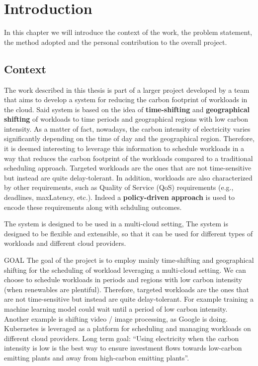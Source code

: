 \chapter{Introduction}
\label{cha:introduction}

In this chapter we will introduce the context of the work, the problem statement, the method adopted and the personal contribution to the overall project.

\section{Context}
\label{sec:context}

The work described in this thesis is part of a larger project developed by a team
that aims to develop a system for reducing the carbon footprint of workloads in the cloud. 
Said system is based on the idea of \textbf{time-shifting} and \textbf{geographical shifting} of workloads to time periods and geographical regions with low carbon intensity.
As a matter of fact, nowadays, the carbon intensity of electricity varies significantly depending on the time of day and the geographical region.
Therefore, it is deemed interesting to leverage this information to schedule workloads in a way that reduces the carbon footprint of the workloads compared to a traditional scheduling approach.
Targeted workloads are the ones that are not time-sensitive but instead are quite delay-tolerant. 
In addition, workloads are also characterized by other requirements, such as Quality of Service (QoS) requirements (e.g., deadlines, maxLatency, etc.).
Indeed a \textbf{policy-driven approach} is used to encode these requirements along with schduling outcomes.


The system is designed to be used in a multi-cloud setting, 
The system is designed to be flexible and extensible, so that it can be used for different types of workloads and different cloud providers.

GOAL
The goal of the project is to employ mainly time-shifting and geographical shifting for the scheduling of workload leveraging a multi-cloud setting.
We can choose to schedule workloads in periods and regions with low carbon intensity (when renewables are plentiful). 
Therefore, targeted workloads are the ones that are not time-sensitive but instead are quite delay-tolerant. For example training a machine learning model could wait until a period of low carbon intensity. Another example is shifting video / image processing, as Google is doing.
Kubernetes is leveraged as a platform for scheduling and managing workloads on different cloud providers.
Long term goal: “Using electricity when the carbon intensity is low is the best way to ensure investment flows towards low-carbon emitting plants and away from high-carbon emitting plants”.

